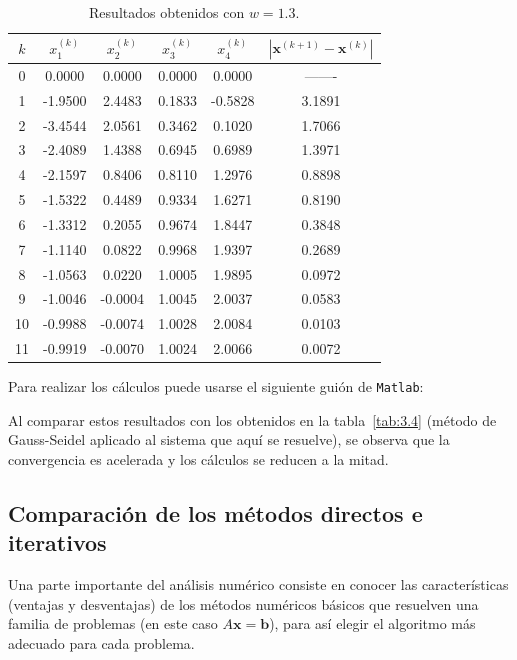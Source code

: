 \documentclass[12pt,letterpaper]{article}
\theoremstyle{definition}
\theoremstyle{plain}
\theoremstyle{remark}
\begin{document}
\begin{table}[h!]
\centering
\caption{Resultados obtenidos con $w = 1.3$.}
\label{tab:3.5}
\begin{tabular}{c|c c c c|c}
$k$ & $x_1^{(k)}$ & $x_2^{(k)}$ & $x_3^{(k)}$ & $x_4^{(k)}$ & $|\mathbf{x}^{(k+1)} - \mathbf{x}^{(k)}|$ \\
\hline
0 & 0.0000 & 0.0000 & 0.0000 & 0.0000 & ------- \\
1 & -1.9500 & 2.4483 & 0.1833 & -0.5828 & 3.1891 \\
2 & -3.4544 & 2.0561 & 0.3462 & 0.1020 & 1.7066 \\
3 & -2.4089 & 1.4388 & 0.6945 & 0.6989 & 1.3971 \\
4 & -2.1597 & 0.8406 & 0.8110 & 1.2976 & 0.8898 \\
5 & -1.5322 & 0.4489 & 0.9334 & 1.6271 & 0.8190 \\
6 & -1.3312 & 0.2055 & 0.9674 & 1.8447 & 0.3848 \\
7 & -1.1140 & 0.0822 & 0.9968 & 1.9397 & 0.2689 \\
8 & -1.0563 & 0.0220 & 1.0005 & 1.9895 & 0.0972 \\
9 & -1.0046 & -0.0004 & 1.0045 & 2.0037 & 0.0583 \\
10 & -0.9988 & -0.0074 & 1.0028 & 2.0084 & 0.0103 \\
11 & -0.9919 & -0.0070 & 1.0024 & 2.0066 & 0.0072
\end{tabular}
\end{table}

\vspace{1em}
\noindent
Para realizar los cálculos puede usarse el siguiente guión de \texttt{Matlab}:



Al comparar estos resultados con los obtenidos en la tabla~\ref{tab:3.4} (método de Gauss-Seidel aplicado al sistema que aquí se resuelve), se observa que la convergencia es acelerada y los cálculos se reducen a la mitad.

\subsection{Comparación de los métodos directos e iterativos}

Una parte importante del análisis numérico consiste en conocer las características (ventajas y desventajas) de los métodos numéricos básicos que resuelven una familia de problemas (en este caso $A\mathbf{x} = \mathbf{b}$), para así elegir el algoritmo más adecuado para cada problema.
\end{document}
